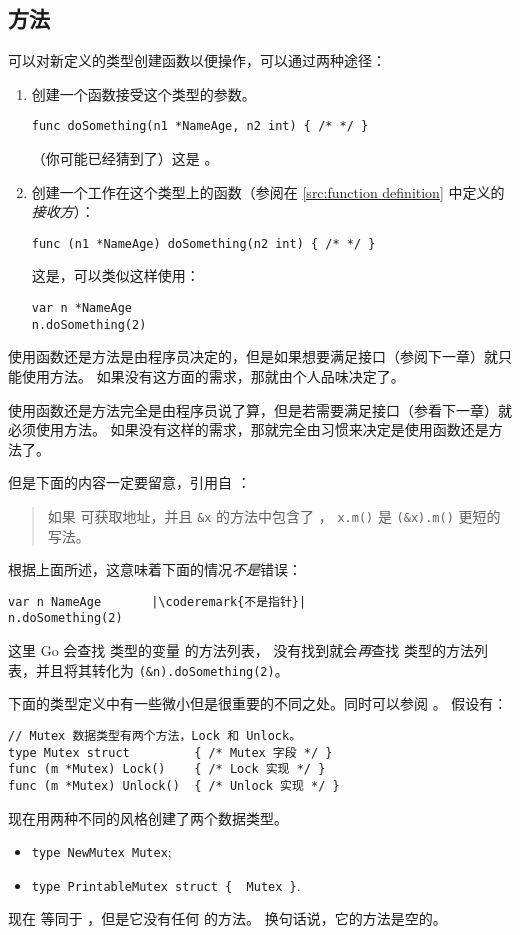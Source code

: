 \subsection{方法}
\label{sec:methods}
可以对新定义的类型创建函数以便操作，可以通过两种途径：
\begin{enumerate}
\item 创建一个函数接受这个类型的参数。
\begin{lstlisting}
func doSomething(n1 *NameAge, n2 int) { /* */ }
\end{lstlisting}
（你可能已经猜到了）这是 。
\item 创建一个工作在这个类型上的函数（参阅在 \ref{src:function definition}
中定义的\emph{接收方}）：
\begin{lstlisting}
func (n1 *NameAge) doSomething(n2 int) { /* */ }
\end{lstlisting}
这是，可以类似这样使用：
\begin{lstlisting}
var n *NameAge
n.doSomething(2)
\end{lstlisting}
\end{enumerate}
使用函数还是方法是由程序员决定的，但是如果想要满足接口（参阅下一章）就只能使用方法。
如果没有这方面的需求，那就由个人品味决定了。

使用函数还是方法完全是由程序员说了算，但是若需要满足接口（参看下一章）就必须使用方法。
如果没有这样的需求，那就完全由习惯来决定是使用函数还是方法了。

但是下面的内容一定要留意，引用自 \cite{go_spec}：
\begin{quote}
如果  可获取地址，并且 \lstinline{&x} 的方法中包含了 ，
\lstinline{x.m()} 是 \mbox{\lstinline{(&x).m()}} 更短的写法。
\end{quote}
根据上面所述，这意味着下面的情况\emph{不是}错误：
\begin{lstlisting}
var n NameAge	    |\coderemark{不是指针}|
n.doSomething(2)    
\end{lstlisting}
这里 Go 会查找  类型的变量  的方法列表，
没有找到就会\emph{再}查找  类型的方法列表，并且将其转化为
\lstinline{(&n).doSomething(2)}。

下面的类型定义中有一些微小但是很重要的不同之处。同时可以参阅 \cite[section~``Type Declarations'']{go_spec}。
假设有：
\begin{lstlisting}
// Mutex 数据类型有两个方法，Lock 和 Unlock。
type Mutex struct         { /* Mutex 字段 */ }
func (m *Mutex) Lock()    { /* Lock 实现 */ }
func (m *Mutex) Unlock()  { /* Unlock 实现 */ }
\end{lstlisting}
现在用两种不同的风格创建了两个数据类型。
\begin{itemize}
\item \lstinline|type NewMutex Mutex|;
\item \lstinline|type PrintableMutex struct {  Mutex }|.
\end{itemize}
现在  等同于 ，但是它没有任何  的方法。
换句话说，它的方法是空的。

